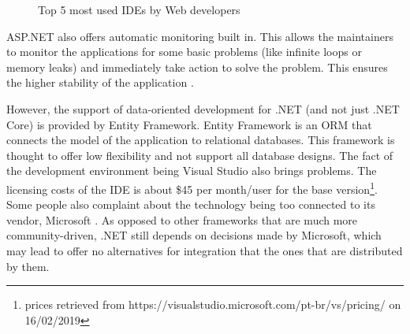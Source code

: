 \begin{figure}[ht]
\centering
{}
\caption[Top 5 most used IDEs by Web developers]{Top 5 most used IDEs by Web developers \footnotemark}
\label{fig:topIdes}
\end{figure}
\par


ASP.NET also offers automatic monitoring built in. This allows the maintainers to monitor the applications for some basic problems (like infinite loops or memory leaks) and immediately take action to solve the problem. This ensures the higher stability of the application \parencite{prosAndConsNetCore}.

\par


However, the support of data-oriented development for .NET (and not just .NET Core) is provided by Entity Framework. Entity Framework is an \gls{ORM} that connects the model of the application to relational databases. This framework is thought to offer low flexibility and not support all database designs. The fact of the development environment being Visual Studio also brings problems. The licensing costs of the \gls{IDE} is about \$45 per month/user for the base version\footnote{prices retrieved from https://visualstudio.microsoft.com/pt-br/vs/pricing/ on 16/02/2019}. Some people also complaint about the technology being too connected to its vendor, Microsoft \parencite{prosAndConsNetCore}. As opposed to other frameworks that are much more community-driven, .NET still depends on decisions made by Microsoft, which may lead to offer no alternatives for integration that the ones that are distributed by them.


